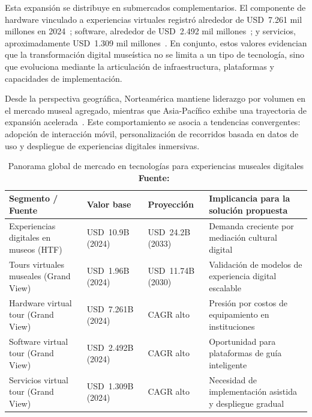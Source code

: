 Esta expansi\'on se distribuye en submercados complementarios. El componente de hardware vinculado a experiencias virtuales registr\'o alrededor de USD~7.261 mil millones en 2024~\cite{grandview2024hardware}; software, alrededor de USD~2.492 mil millones~\cite{grandview2024software}; y servicios, aproximadamente USD~1.309 mil millones~\cite{grandview2024services}. En conjunto, estos valores evidencian que la transformaci\'on digital muse\'istica no se limita a un tipo de tecnolog\'ia, sino que evoluciona mediante la articulaci\'on de infraestructura, plataformas y capacidades de implementaci\'on.

Desde la perspectiva geogr\'afica, Norteam\'erica mantiene liderazgo por volumen en el mercado museal agregado, mientras que Asia-Pac\'ifico exhibe una trayectoria de expansi\'on acelerada~\cite{bussresearch2026museums,grandview2024art}. Este comportamiento se asocia a tendencias convergentes: adopci\'on de interacci\'on m\'ovil, personalizaci\'on de recorridos basada en datos de uso y despliegue de experiencias digitales inmersivas.

\vspace{0.5cm}

\begin{table}[h!]
	\centering
	\small
	\setlength{\tabcolsep}{4pt}
	\begin{tabular}{>{\raggedright\arraybackslash}p{4.0cm} >{\raggedright\arraybackslash}p{3.0cm} >{\raggedright\arraybackslash}p{3.0cm} >{\raggedright\arraybackslash}p{3.8cm}}
		\hline
		\textbf{Segmento / Fuente} & \textbf{Valor base} & \textbf{Proyecci\'on} & \textbf{Implicancia para la solución propuesta} \\
		\hline
		Experiencias digitales en museos (HTF) & USD~10.9B (2024) & USD~24.2B (2033) & Demanda creciente por mediaci\'on cultural digital \\
		Tours virtuales museales (Grand View) & USD~1.96B (2024) & USD~11.74B (2030) & Validaci\'on de modelos de experiencia digital escalable \\
		Hardware virtual tour (Grand View) & USD~7.261B (2024) & CAGR alto & Presi\'on por costos de equipamiento en instituciones \\
		Software virtual tour (Grand View) & USD~2.492B (2024) & CAGR alto & Oportunidad para plataformas de gu\'ia inteligente \\
		Servicios virtual tour (Grand View) & USD~1.309B (2024) & CAGR alto & Necesidad de implementaci\'on asistida y despliegue gradual \\
		\hline
	\end{tabular}
	\caption[Panorama global de mercado en tecnologías museales digitales]{Panorama global de mercado en tecnolog\'ias para experiencias museales digitales \textbf{Fuente:}~\cite{htf2025digital,grandview2024art,grandview2024hardware,grandview2024software,grandview2024services}}
\end{table}

